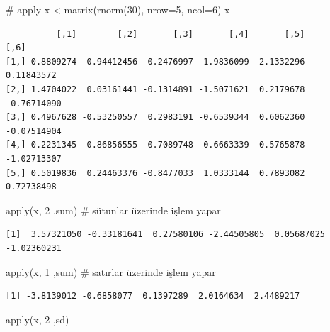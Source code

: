 \documentclass[
  letterpaper,
  DIV=11,
  numbers=noendperiod]{scrreprt}
\newenvironment{Shaded}{\begin{snugshade}}{\end{snugshade}}
\newcommand{\AttributeTok}[1]{\textcolor[rgb]{0.40,0.45,0.13}{#1}}
\newcommand{\CommentTok}[1]{\textcolor[rgb]{0.37,0.37,0.37}{#1}}
\newcommand{\DecValTok}[1]{\textcolor[rgb]{0.68,0.00,0.00}{#1}}
\newcommand{\FunctionTok}[1]{\textcolor[rgb]{0.28,0.35,0.67}{#1}}
\newcommand{\NormalTok}[1]{\textcolor[rgb]{0.00,0.23,0.31}{#1}}
\newcommand{\OtherTok}[1]{\textcolor[rgb]{0.00,0.23,0.31}{#1}}
\begin{document}
\begin{Shaded}
\begin{Highlighting}[]
\CommentTok{\# apply}
\NormalTok{x }\OtherTok{\textless{}{-}}\FunctionTok{matrix}\NormalTok{(}\FunctionTok{rnorm}\NormalTok{(}\DecValTok{30}\NormalTok{), }\AttributeTok{nrow=}\DecValTok{5}\NormalTok{, }\AttributeTok{ncol=}\DecValTok{6}\NormalTok{)}
\NormalTok{x}
\end{Highlighting}
\end{Shaded}

\begin{verbatim}
          [,1]        [,2]       [,3]       [,4]       [,5]        [,6]
[1,] 0.8809274 -0.94412456  0.2476997 -1.9836099 -2.1332296  0.11843572
[2,] 1.4704022  0.03161441 -0.1314891 -1.5071621  0.2179678 -0.76714090
[3,] 0.4967628 -0.53250557  0.2983191 -0.6539344  0.6062360 -0.07514904
[4,] 0.2231345  0.86856555  0.7089748  0.6663339  0.5765878 -1.02713307
[5,] 0.5019836  0.24463376 -0.8477033  1.0333144  0.7893082  0.72738498
\end{verbatim}

\begin{Shaded}
\begin{Highlighting}[]
\FunctionTok{apply}\NormalTok{(x, }\DecValTok{2}\NormalTok{ ,sum) }\CommentTok{\# sütunlar üzerinde işlem yapar}
\end{Highlighting}
\end{Shaded}

\begin{verbatim}
[1]  3.57321050 -0.33181641  0.27580106 -2.44505805  0.05687025 -1.02360231
\end{verbatim}

\begin{Shaded}
\begin{Highlighting}[]
\FunctionTok{apply}\NormalTok{(x, }\DecValTok{1}\NormalTok{ ,sum) }\CommentTok{\# satırlar üzerinde işlem yapar}
\end{Highlighting}
\end{Shaded}

\begin{verbatim}
[1] -3.8139012 -0.6858077  0.1397289  2.0164634  2.4489217
\end{verbatim}

\begin{Shaded}
\begin{Highlighting}[]
\FunctionTok{apply}\NormalTok{(x, }\DecValTok{2}\NormalTok{ ,sd)}
\end{Highlighting}
\end{Shaded}
\end{document}
